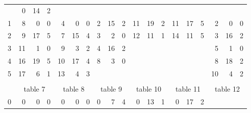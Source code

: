 \begin{esempio}
\begin{figure}[H]
{\begin{tabular}{r|rrr|rrr|rrr|rrr|rrr|rrr}
                                                       &  \textcolor{nordcyan}{0} & \textcolor{nordcyan}{14} &  \textcolor{nordcyan}{2} \\
        1 &  8 &  0 &  0 &  4 &  0 &  0 &  2 & 15 &  2 & 11 & 19 &  2 & 11 & 17 &  5 &  2 &  0 &  0 \\
        2 &  \textcolor{nordred}{9} & \textcolor{nordred}{17} &  \textcolor{nordred}{5}
                                                                                                                       &  7 & 15 &  4 &  3 &  2 &  0 & 12 & 11 &  1 & 14 & 11 &  5 &  \textcolor{nordred}{3} & \textcolor{nordred}{16} &  \textcolor{nordred}{2} \\
        3 & 11 &  1 &  0 &  9 &  3 &  2 &  \textcolor{nordcyan}{4} & \textcolor{nordcyan}{16} &  \textcolor{nordcyan}{2}
                         &    &    &    &    &    &    &  5 &  1 &  0 \\
        4 & 16 & 19 &  5 & 10 & 17 &  4 &  \textcolor{nordred}{8} &  \textcolor{nordred}{3} &  \textcolor{nordred}{0}
                         &    &    &    &    &    &    &  8 & 18 &  2 \\
        5 & 17 &  6 &  1 & \textcolor{nordred}{13} &  \textcolor{nordred}{4} &  \textcolor{nordred}{3}
          &    &    &    &    &    &    &    &    &    & 10 &  4 &  2 \\
        \multicolumn{7}{c}{} \\[3ex]
        \multicolumn{1}{c}{} &
                               \multicolumn{3}{c}{table 7} &
                                                             \multicolumn{3}{c}{table 8} &
                                                                                           \multicolumn{3}{c}{table 9} &
                                                                                                                         \multicolumn{3}{c}{table 10} &
                                                                                                                                                        \multicolumn{3}{c}{table 11} &
                                                                                                                                                                                       \multicolumn{3}{c}{table 12} \\
        \hline
        0 &  0 &  0 &  0 &  0 &  0 &  0 &  \textcolor{nordcyan}{0} &  \textcolor{nordcyan}{7} &  \textcolor{nordcyan}{4}
                         &  0 & 13 &  1 &  \textcolor{nordred}{0} & \textcolor{nordred}{17} &  \textcolor{nordred}{2}

\end{tabular}}
\end{figure}
\end{esempio}
